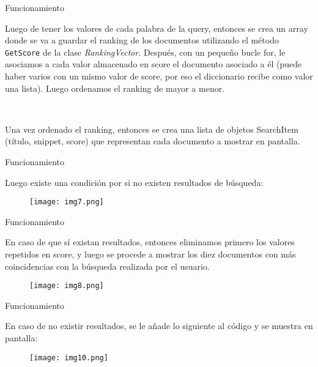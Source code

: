 \begin{frame}[fragile]{Funcionamiento}

  Luego de tener los valores de cada palabra de la query, entonces se crea un array donde se va a guardar
  el ranking de los documentos utilizando el método \texttt{GetScore} de la clase \textit{RankingVector}. Después, con un pequeño
  bucle for, le asociamos a cada valor almacenado en score el documento asociado a él (puede haber varios con un
  mismo valor de score, por eso el diccionario recibe como valor una lista). Luego ordenamos el ranking de mayor a
  menor.

\pause


\ 


  Una vez ordenado el ranking, entonces se crea una lista de objetos SearchItem (título, snippet, score) que
  representan cada documento a mostrar en pantalla. 
  
\end{frame}

\begin{frame}[fragile]{Funcionamiento}
  
  Luego existe una condición por si no existen resultados de
  búsqueda:

\pause

\begin{figure}
  \texttt{[image: img7.png]}
\end{figure}

\end{frame}

\begin{frame}[fragile]{Funcionamiento}

  En caso de que sí existan resultados, entonces eliminamos primero los valores repetidos en score, y luego se procede a 
  mostrar los diez documentos con más coincidencias con la búsqueda realizada por el usuario.

\pause


\begin{figure}
  \texttt{[image: img8.png]}
\end{figure}


\end{frame}

\begin{frame}[fragile]{Funcionamiento}

En caso de no existir resultados, se le añade lo siguiente al código y se muestra en pantalla:


\pause


\begin{figure}
  \texttt{[image: img10.png]}
\end{figure}



\end{frame}


